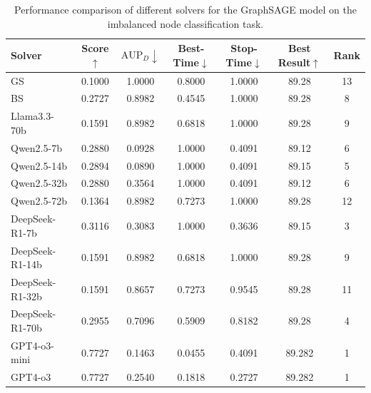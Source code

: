 \begin{table}[h]
    \centering
    \setlength{\tabcolsep}{3pt}
    \renewcommand\arraystretch{1.5}
    \caption{Performance comparison of different solvers for the GraphSAGE model on the imbalanced node classification task.}
    \begin{tabular}{l|cccccc}
    \toprule
    Solver           & Score$\uparrow$ & $\text{AUP}_D\downarrow$ & Best-Time$\downarrow$ & Stop-Time$\downarrow$ & Best Result$\uparrow$ & Rank \\
    \midrule
    GS & 0.1000 & 1.0000 & 0.8000 & 1.0000 & 89.28 & 13 \\
    BS & 0.2727 & 0.8982 & 0.4545 & 1.0000 & 89.28 & 8 \\
    Llama3.3-70b & 0.1591 & 0.8982 & 0.6818 & 1.0000 & 89.28 & 9 \\
    Qwen2.5-7b & 0.2880 & 0.0928 & 1.0000 & 0.4091 & 89.12 & 6 \\
    Qwen2.5-14b & 0.2894 & 0.0890 & 1.0000 & 0.4091 & 89.15 & 5 \\
    Qwen2.5-32b & 0.2880 & 0.3564 & 1.0000 & 0.4091 & 89.12 & 6 \\
    Qwen2.5-72b & 0.1364 & 0.8982 & 0.7273 & 1.0000 & 89.28 & 12 \\
    DeepSeek-R1-7b & 0.3116 & 0.3083 & 1.0000 & 0.3636 & 89.15 & 3 \\
    DeepSeek-R1-14b & 0.1591 & 0.8982 & 0.6818 & 1.0000 & 89.28 & 9 \\
    DeepSeek-R1-32b & 0.1591 & 0.8657 & 0.7273 & 0.9545 & 89.28 & 11 \\
    DeepSeek-R1-70b & 0.2955 & 0.7096 & 0.5909 & 0.8182 & 89.28 & 4 \\
    GPT4-o3-mini & 0.7727 & 0.1463 & 0.0455 & 0.4091 & 89.282 & 1 \\
    GPT4-o3 & 0.7727 & 0.2540 & 0.1818 & 0.2727 & 89.282 & 1 \\
    \bottomrule
    \end{tabular}
    \label{tab:GraphSAGE}
\end{table}





